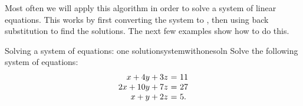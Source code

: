 Most often we will apply this algorithm in order to solve a system of
linear equations. This works by first converting the system to {\ef},
then using back substitution to find the solutions. The next few
examples show how to do this.

\begin{example}{Solving a system of equations: one solution}{systemwithonesoln}
  Solve the following system of equations:
  \begin{equation*}
    \begin{array}{r@{~}c@{~}l}
      x+4y+3z &=& 11\\
      2x+10y+7z &=& 27\\
      x+y+2z &=& 5.
    \end{array}
  \end{equation*}
\end{example}

